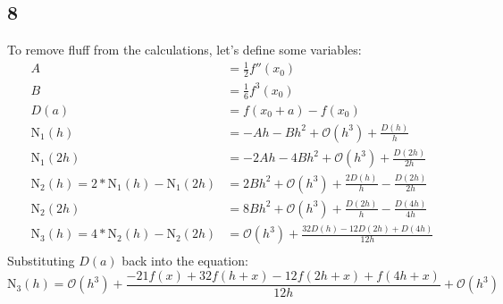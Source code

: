 \documentclass{oisinclass}
\begin{document}
\subsection*{8}
To remove fluff from the calculations, let's define some variables:
\begin{align*}
	A                                                                                                                             & = \frac{1}{2}f''(x_0)                                                                                                    \\
	B                                                                                                                             & = \frac{1}{6}f^3(x_0)                                                                                                    \\
	D(a)                                                                                                                          & = f(x_0 + a) - f(x_0)                                                                                                    \\[3ex]
	\operatorname{N_{1}}{\left(h \right)}                                                                                         & = - A h - B h^{2} + \mathcal{O}{\left(h^{3} \right)} + \frac{D{\left(h \right)}}{h}                                      \\
	\operatorname{N_{1}}{\left(2 h \right)}                                                                                       & =- 2 A h - 4 B h^{2} + \mathcal{O}{\left(h^{3} \right)} + \frac{D{\left(2 h \right)}}{2 h}                               \\
	\operatorname{N_{2}}{\left(h \right)} = 2 * \operatorname{N_{1}}{\left( h \right)} - \operatorname{N_{1}}{\left(2 h \right)}  & = 2 B h^{2} + \mathcal{O}{\left(h^{3} \right)} + \frac{2 D{\left(h \right)}}{h} - \frac{D{\left(2 h \right)}}{2 h}       \\
	\operatorname{N_{2}}{\left(2 h \right)}                                                                                       & =8 B h^{2} + \mathcal{O}{\left(h^{3} \right)} + \frac{D{\left(2 h \right)}}{h} - \frac{D{\left(4 h \right)}}{4 h}        \\
	\operatorname{N_{3}}{\left(h \right)}  = 4 * \operatorname{N_{2}}{\left( h \right)} - \operatorname{N_{2}}{\left(2 h \right)} & = \mathcal{O}{\left(h^{3} \right)} + \frac{32 D{\left(h \right)} - 12 D{\left(2 h \right)} + D{\left(4 h \right)}}{12 h} \\
\end{align*}
Substituting \(D(a)\) back into the equation:
\[
	\operatorname{N_{3}}{\left(h \right)}  =\mathcal{O}{\left(h^{3} \right)} + \frac{- 21 f{\left(x \right)} + 32 f{\left(h + x \right)} - 12 f{\left(2 h + x \right)} + f{\left(4 h + x \right)}}{12 h} + \mathcal{O}{\left(h^{3} \right)}
\]
\end{document}
